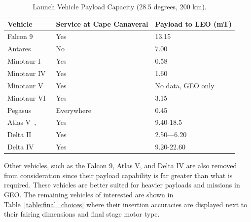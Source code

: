 \documentclass[paper=letter, fontsize=11pt]{scrartcl} %
\numberwithin{equation}{section} %
\numberwithin{figure}{section} %
\numberwithin{table}{section} %
\begin{document}
\begin{table}[H]
    \centering
    \begin{tabular}{l l l}
        \toprule
        Vehicle                                & Service at Cape Canaveral & Payload to LEO (mT) \\
        \midrule
        Falcon 9~\cite{ref12_1}                & Yes                       & 13.15               \\
        Antares~\cite{ref12_2}                 & No                        & 7.00                \\
        Minotaur I~\cite{ref12_3}              & Yes                       & 0.58                \\
        Minotaur IV~\cite{ref12_4}             & Yes                       & 1.60                \\
        Minotaur V                             & Yes                       & No data, GEO only   \\
        Minotaur VI~\cite{ref12_5}             & Yes                       & 3.15                \\
        Pegasus~\cite{ref12_6}                 & Everywhere                & 0.45                \\
        Atlas V~\cite{ref12_7}, \cite{ref12_8} & Yes                       & 9.40-18.5           \\
        Delta II~\cite{ref12_9}                & Yes                       & 2.50---6.20         \\
        Delta IV~\cite{ref12_10}               & Yes                       & 9.20-22.60          \\
        \bottomrule
    \end{tabular}
    \caption{Launch Vehicle Payload Capacity (28.5 degrees, 200 km).}
    \label{table:potential_payload_capacity}
\end{table}

Other vehicles, such as the Falcon 9, Atlas V, and Delta IV are also removed from consideration since their payload capability is far greater than what is required. These vehicles are better suited for heavier payloads and missions in GEO. The remaining vehicles of interested are shown in Table~\ref{table:final_choices} where their insertion accuracies are displayed next to their fairing dimensions and final stage motor type.
\end{document}
